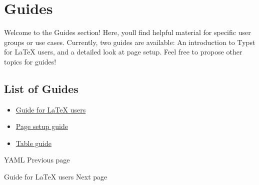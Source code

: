 \section{Guides}\label{guides}

Welcome to the Guides section! Here, you\textquotesingle ll find helpful
material for specific user groups or use cases. Currently, two guides
are available: An introduction to Typst for LaTeX users, and a detailed
look at page setup. Feel free to propose other topics for guides!

\subsection{List of Guides}\label{list-of-guides}

\begin{itemize}
\tightlist
\item
  \href{/docs/guides/guide-for-latex-users/}{Guide for LaTeX users}
\item
  \href{/docs/guides/page-setup-guide/}{Page setup guide}
\item
  \href{/docs/guides/table-guide/}{Table guide}
\end{itemize}

\href{/docs/reference/data-loading/yaml/}{\pandocbounded{}}

{ YAML } { Previous page }

\href{/docs/guides/guide-for-latex-users/}{\pandocbounded{}}

{ Guide for LaTeX users } { Next page }


